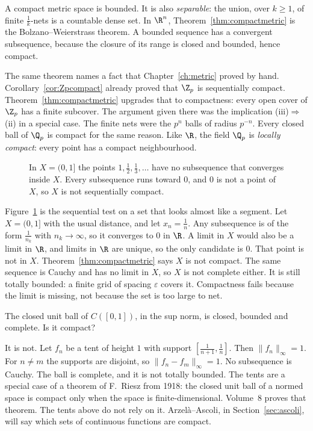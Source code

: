A compact metric space is bounded. It is also \emph{separable}: the union, over $k\ge1$, of finite $\frac1k$-nets is a countable dense set. In $\R^n$, Theorem~\ref{thm:compactmetric} is the Bolzano--Weierstrass theorem. A bounded sequence has a convergent subsequence, because the closure of its range is closed and bounded, hence compact.

The same theorem names a fact that Chapter~\ref{ch:metric} proved by hand. Corollary~\ref{cor:Zpcompact} already proved that $\Z_p$ is sequentially compact. Theorem~\ref{thm:compactmetric} upgrades that to compactness: every open cover of $\Z_p$ has a finite subcover. The argument given there was the implication (iii)$\Rightarrow$(ii) in a special case. The finite nets were the $p^n$ balls of radius $p^{-n}$. Every closed ball of $\Q_p$ is compact for the same reason. Like $\R$, the field $\Q_p$ is \emph{locally compact}: every point has a compact neighbourhood.

\begin{figure}[ht]
\centering
{}
\caption{In $X=(0,1]$ the points $1,\frac12,\frac13,\ldots$ have no subsequence that converges inside $X$. Every subsequence runs toward $0$, and $0$ is not a point of $X$, so $X$ is not sequentially compact.}
\label{fig:rwescape}
\end{figure}

Figure~\ref{fig:rwescape} is the sequential test on a set that looks almost like a segment. Let $X=(0,1]$ with the usual distance, and let $x_n=\frac1n$. Any subsequence is of the form $\frac1{n_k}$ with $n_k\to\infty$, so it converges to $0$ in $\R$. A limit in $X$ would also be a limit in $\R$, and limits in $\R$ are unique, so the only candidate is $0$. That point is not in $X$. Theorem~\ref{thm:compactmetric} says $X$ is not compact. The same sequence is Cauchy and has no limit in $X$, so $X$ is not complete either. It is still totally bounded: a finite grid of spacing $\varepsilon$ covers it. Compactness fails because the limit is missing, not because the set is too large to net.

\begin{think}
The closed unit ball of $C([0,1])$, in the sup norm, is closed, bounded and complete. Is it compact?
\end{think}

It is not. Let $f_n$ be a tent of height $1$ with support $[\frac1{n+1},\frac1n]$. Then $\|f_n\|_\infty=1$. For $n\ne m$ the supports are disjoint, so $\|f_n-f_m\|_\infty=1$. No subsequence is Cauchy. The ball is complete, and it is not totally bounded. The tents are a special case of a theorem of F.~Riesz from 1918: the closed unit ball of a normed space is compact only when the space is finite-dimensional. Volume~8 proves that theorem. The tents above do not rely on it. Arzel\`a--Ascoli, in Section~\ref{sec:ascoli}, will say which sets of continuous functions are compact.


